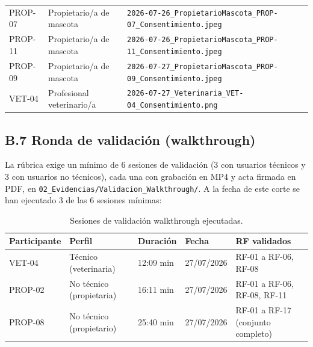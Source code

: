 \documentclass[journal,onecolumn]{IEEEtran}
\begin{document}
\begin{table}[H]
\begin{tabularx}{\textwidth}{@{}l l X@{}}
			PROP-07 & Propietario/a de mascota & \texttt{2026-07-26\_PropietarioMascota\_PROP-07\_Consentimiento.jpeg} \\
			
			PROP-11 & Propietario/a de mascota & \texttt{2026-07-26\_PropietarioMascota\_PROP-11\_Consentimiento.jpeg} \\
			
			PROP-09 & Propietario/a de mascota & \texttt{2026-07-27\_PropietarioMascota\_PROP-09\_Consentimiento.jpeg} \\
			
			VET-04 & Profesional veterinario/a & \texttt{2026-07-27\_Veterinaria\_VET-04\_Consentimiento.png} \\
			
			\bottomrule
		\end{tabularx}
	\end{table}
	
	
	\subsection*{B.7 Ronda de validación (walkthrough)}
	
	La rúbrica exige un mínimo de 6 sesiones de validación (3 con usuarios
	técnicos y 3 con usuarios no técnicos), cada una con grabación en MP4 y
	acta firmada en PDF, en \texttt{02\_Evidencias/Validacion\_Walkthrough/}.
	A la fecha de este corte se han ejecutado 3 de las 6 sesiones mínimas:
	
	\begin{table}[H]
		\centering
		\small
		\caption{Sesiones de validación walkthrough ejecutadas.}
		\label{tab:walkthrough}
		\begin{tabularx}{\textwidth}{@{}p{2.6cm} p{3.2cm} p{2.4cm} p{1.8cm} X@{}}
			\toprule
			\textbf{Participante} & \textbf{Perfil} & \textbf{Duración} & \textbf{Fecha} & \textbf{RF validados} \\
			\midrule
			VET-04 & Técnico (veterinaria) & 12:09 min & 27/07/2026 & RF-01 a RF-06, RF-08 \\
			PROP-02 & No técnico (propietaria) & 16:11 min & 27/07/2026 & RF-01 a RF-06, RF-08, RF-11 \\
			PROP-08 & No técnico (propietario) & 25:40 min & 27/07/2026 & RF-01 a RF-17 (conjunto completo) \\
			\bottomrule
		\end{tabularx}
	\end{table}
	
\end{document}
